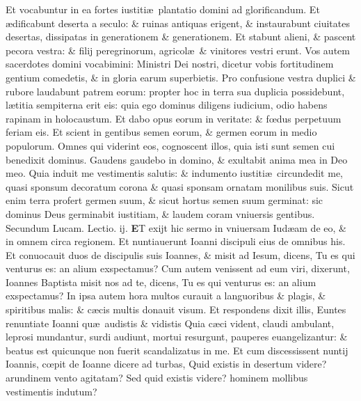 \documentclass[a5paper,10pt]{book}
\def\leftmarginnote{%
	\lrmarginnote{\hskip -\marginparsep \hskip -6.5em}}
\def\ae{æ}
\def\oe{œ}
\begin{document}
\begin{multicols*}{2}
Et vocabuntur in ea fortes iustiti\ae \ plantatio domini ad glorificandum.
Et \ae dificabunt deserta a seculo: \& ruinas antiquas erigent, \& instaurabunt ciuitates desertas, dissipatas in generationem \& generationem.
Et stabunt alieni, \& pascent pecora vestra: \& filij peregrinorum, agricol\ae \ \& vinitores vestri erunt.
Vos autem sacerdotes domini vocabimini: Ministri Dei nostri, dicetur vobis fortitudinem gentium comedetis, \& in gloria earum superbietis.
Pro confusione vestra duplici \& rubore laudabunt patrem eorum: propter hoc in terra sua duplicia possidebunt, l\ae titia sempiterna erit eis: quia ego dominus diligens iudicium, odio habens rapinam in holocaustum.
Et dabo opus eorum in veritate: \& f\oe dus perpetuum feriam eis.
Et scient in gentibus semen eorum, \& germen eorum in medio populorum.
Omnes qui viderint eos, cognoscent illos, quia isti sunt semen cui benedixit dominus.
Gaudens gaudebo in domino, \& exultabit anima mea in Deo meo.
Quia induit me vestimentis salutis: \& indumento iustiti\ae \ circundedit me, quasi sponsum decoratum corona \& quasi sponsam ornatam monilibus suis.
Sicut enim terra profert germen suum, \& sicut hortus semen suum germinat: sic dominus Deus germinabit iustitiam, \& laudem coram vniuersis gentibus.
\fancyhead[C]{\color{red} Feria. iij. Dominic\ae . iij. aduentus}
\newline \color{red} Secundum Lucam. \hfill Lectio. ij. \color{black}
\vspace{-.25em}
\lettrine[lines=2]{\bfseries \color{red} E}{}T\leftmarginnote{\begin{flushright}ca. 7.\end{flushright}} exijt hic sermo in vniuersam Iud\ae am de eo, \& 
in omnem circa regionem.
Et nuntiauerunt Ioanni discipuli eius de omnibus his.
Et conuocauit duos de discipulis suis Ioannes, \& misit ad Iesum, dicens, Tu es qui venturus es: an alium exspectamus?
Cum autem venissent ad eum viri, dixerunt, Ioannes Baptista misit nos ad te, dicens, Tu es qui venturus es: an alium exspectamus?
In ipsa autem hora multos curauit a languoribus \& plagis, \& spiritibus malis: \& c\ae cis multis donauit visum.
Et respondens dixit illis, Euntes renuntiate Ioanni qu\ae \ audistis \& vidistis Quia c\ae ci vident, claudi ambulant, leprosi mundantur, surdi audiunt, mortui resurgunt, pauperes euangelizantur: \& beatus est quicunque non fuerit scandalizatus in me.
Et cum discessissent nuntij Ioannis, c\oe pit de Ioanne dicere ad turbas, Quid existis in desertum videre? arundinem vento agitatam?
Sed quid existis videre? hominem mollibus vestimentis indutum?

\end{multicols*}
\end{document}
